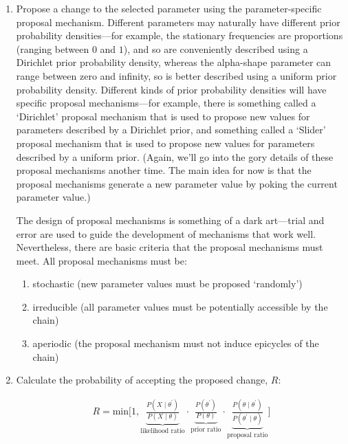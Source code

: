 \begin{enumerate}
\item{Propose a change to the selected parameter using the parameter-specific proposal
mechanism. 
Different parameters may naturally have different prior probability densities---for example, the stationary frequencies are proportions (ranging between $0$ and $1$), and so are conveniently described using a Dirichlet prior probability density, whereas the alpha-shape parameter can range between zero and infinity, so is better described using a uniform prior probability density. 
Different kinds of prior probability densities will have specific proposal mechanisms---for example, there is something called a `Dirichlet' proposal mechanism that is used to propose new values for parameters described by a Dirichlet prior, and something called a `Slider' proposal mechanism that is used to propose new values for parameters described by a uniform prior. 
(Again, we'll go into the gory details of these proposal mechanisms another time. 
The main idea for now is that the proposal mechanisms generate a new parameter value by poking the current parameter value.)

The design of proposal mechanisms is something of a dark art---trial and error are used to guide the development of mechanisms that work well. 
Nevertheless, there are basic criteria that the proposal mechanisms must meet. 
All proposal mechanisms must be:

\begin{enumerate}
\item{stochastic (new parameter values must be proposed `randomly')}

\item{irreducible (all parameter values must be potentially accessible by the chain)}

\item{aperiodic (the proposal mechanism must not induce epicycles of the chain)}
\end{enumerate}}

\item{Calculate the probability of accepting the proposed change, $R$:

\begin{align}
R = \text{min}\Bigg[1, \underbrace{\frac{P(X \mid \theta ^{\prime})}{P(X \mid \theta )}}_{\text{likelihood ratio}} \cdot \underbrace{\frac{ P(\theta ^{\prime})}{P(\theta)}}_\text{prior ratio} \cdot \underbrace{\frac{P(\theta \mid \theta ^{\prime})}{P(\theta ^{\prime} \mid \theta)}}_\text{proposal ratio} \Bigg]
\end{align}

}
\end{enumerate}
